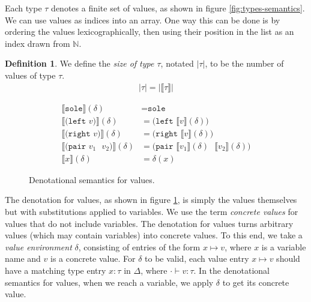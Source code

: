 \documentclass{report}
\theoremstyle{definition}
\newtheorem{definition}{Definition}
\newcommand{\den}[1]{\llbracket #1 \rrbracket}
\begin{document}
Each type \(\tau\) denotes a finite set of values, as shown in figure \ref{fig:types-semantics}.
We can use values as indices into an array.
One way this can be done is by ordering the values lexicographically, then using their position in the list as an index drawn from \(\mathbb{N}\).

\begin{definition}
	We define the \emph{size of type \(\tau\)}, notated \(|\tau|\), to be the number of values of type \(\tau\).
	\begin{align*}
		|\tau| = | \den{\tau} |
	\end{align*}
\end{definition}

\begin{figure}
\begin{align*}
	\den{\texttt{sole}} (\delta) &= \texttt{sole} \\
	\den{\texttt{(left \(v\))}} (\delta) &= \texttt{(left \(\den{v} (\delta) \))} \\
	\den{\texttt{(right \(v\))}} (\delta) &= \texttt{(right \(\den{v} (\delta) \))} \\
	\den{\texttt{(pair \(v_1\) \(v_2\))}} (\delta) &= \texttt{(pair \(\den{v_1} (\delta) \) \(\den{v_2} (\delta)\))} \\
	\den{x} (\delta) &= \delta(x)
\end{align*}
\caption{Denotational semantics for values.}
\label{fig:values-semantics}
\end{figure}

The denotation for values, as shown in figure \ref{fig:values-semantics}, is simply the values themselves but with substitutions applied to variables.
We use the term \emph{concrete values} for values that do not include variables.
The denotation for values turns arbitrary values (which may contain variables) into concrete values.
To this end, we take a \emph{value environment} \(\delta\), consisting of entries of the form \(x \mapsto v\), where \(x\) is a variable name and \(v\) is a concrete value.
For \(\delta\) to be valid, each value entry \(x \mapsto v\) should have a matching type entry \(x : \tau\) in \(\Delta\), where \(\cdot \vdash v : \tau\).
In the denotational semantics for values, when we reach a variable, we apply \(\delta\) to get its concrete value.
\end{document}
